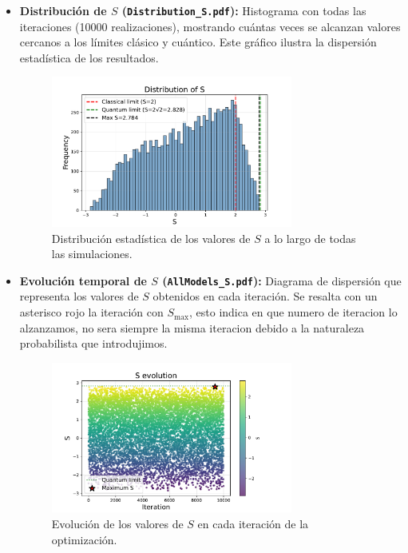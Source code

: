 \documentclass[11pt]{article}
\begin{document}
\begin{itemize}
    \item \textbf{Distribución de $S$ (\texttt{Distribution\_S.pdf}):}  
    Histograma con todas las iteraciones (10000 realizaciones), mostrando cuántas veces se alcanzan valores cercanos a los límites clásico y cuántico. Este gráfico ilustra la dispersión estadística de los resultados.
    
    \begin{figure}[H]
        \centering
        \includegraphics[width=0.75\textwidth]{Figures/Distribution_S.pdf}
        \caption{Distribución estadística de los valores de $S$ a lo largo de todas las simulaciones.}
    \end{figure}

    \item \textbf{Evolución temporal de $S$ (\texttt{AllModels\_S.pdf}):}  
    Diagrama de dispersión que representa los valores de $S$ obtenidos en cada iteración. Se resalta con un asterisco rojo la iteración con $S_{\max}$, esto indica en que numero de iteracion lo alzanzamos, no sera siempre la misma iteracion debido a la naturaleza probabilista que introdujimos.
    
    \begin{figure}[H]
        \centering
        \includegraphics[width=0.75\textwidth]{Figures/AllModels_S.pdf}
        \caption{Evolución de los valores de $S$ en cada iteración de la optimización.}
    \end{figure}


\end{itemize}
\end{document}
